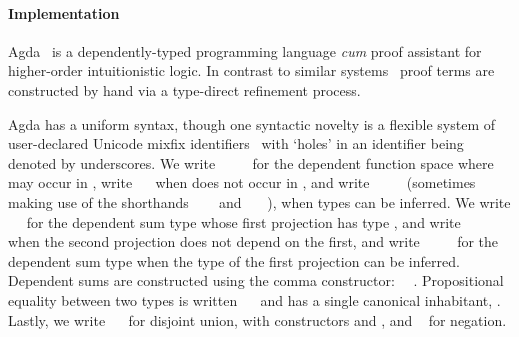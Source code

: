 

\paragraph{Implementation}

Agda~\cite{norell_dependently_2009} is a dependently-typed programming language \emph{cum} proof assistant for higher-order intuitionistic logic.
In contrast to similar systems~\cite{bertot_short_2008,asperti_matita_2011} proof terms are constructed by hand via a type-direct refinement process.

Agda has a uniform syntax, though one syntactic novelty is a flexible system of user-declared Unicode mixfix identifiers~\cite{danielsson_parsing_2011} with `holes' in an identifier being denoted by underscores.
We write \AgdaSymbol{(}~\AgdaSymbol{:}~\AgdaSymbol{)}~~ for the dependent function space where  may occur in , write ~~ when  does not occur in , and write \AgdaSymbol{\{}~\AgdaSymbol{:}~\AgdaSymbol{\}}~~ (sometimes making use of the shorthands ~~~ and ~\AgdaSymbol{\{}\AgdaSymbol{\}}~~), when types can be inferred.
We write ~~ for the dependent sum type whose first projection has type , and write ~~ when the second projection does not depend on the first, and write ~~~~ for the dependent sum type when the type of the first projection can be inferred.
Dependent sums are constructed using the comma constructor: ~\AgdaInductiveConstructor{,}~.
Propositional equality between two types is written ~~ and has a single canonical inhabitant, .
Lastly, we write ~~ for disjoint union, with constructors  and , and ~ for negation.

